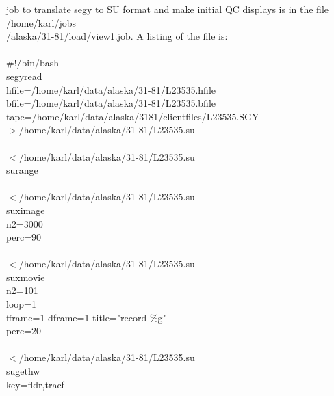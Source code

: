 job to translate segy to SU format and make initial QC displays is in the file /home/karl/jobs\\
/alaska/31-81/load/view1.job.  A listing of the file is: \\
 \\
\#!/bin/bash \\
segyread \ \\
  hfile=/home/karl/data/alaska/31-81/L23535.hfile \ \\
  bfile=/home/karl/data/alaska/31-81/L23535.bfile \ \\
 tape=/home/karl/data/alaska/3181/clientfiles/L23535.SGY \ \\
$>$/home/karl/data/alaska/31-81/L23535.su \ \\
 \\
$<$/home/karl/data/alaska/31-81/L23535.su \ \\
    surange \\
 \\
$<$/home/karl/data/alaska/31-81/L23535.su \ \\
    suximage \ \\
        n2=3000 \ \\
        perc=90 \\
 \\
$<$/home/karl/data/alaska/31-81/L23535.su \ \\
    suxmovie \ \\
        n2=101 \ \\
        loop=1  \ \\
        fframe=1 dframe=1 title="record \%g" \ \\
        perc=20 \\
 \\
$<$/home/karl/data/alaska/31-81/L23535.su \ \\
    sugethw \ \\
        key=fldr,tracf  \\
 \\
 \\
 \\
 \\
 \\
 \\